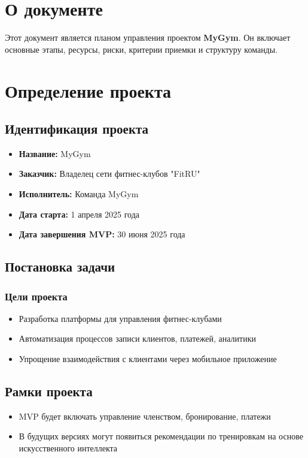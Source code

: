 \documentclass[14pt, russian]{matmex-diploma-custom}
\begin{document}

\maketitle
\section{О документе}
Этот документ является планом управления проектом \textbf{MyGym}. Он включает основные этапы, ресурсы, риски, критерии приемки и структуру команды.

\section{Определение проекта}
\subsection{Идентификация проекта}
\begin{itemize}
\item \textbf{Название:} MyGym
\item \textbf{Заказчик:} Владелец сети фитнес-клубов "FitRU"
\item \textbf{Исполнитель:} Команда MyGym
\item \textbf{Дата старта:} 1 апреля 2025 года
\item \textbf{Дата завершения MVP:} 30 июня 2025 года
\end{itemize}

\subsection{Постановка задачи}
\subsubsection{Цели проекта}
\begin{itemize}
\item Разработка платформы для управления фитнес-клубами
\item Автоматизация процессов записи клиентов, платежей, аналитики
\item Упрощение взаимодействия с клиентами через мобильное приложение
\end{itemize}

\subsection{Рамки проекта}
\begin{itemize}
\item MVP будет включать управление членством, бронирование, платежи
\item В будущих версиях могут появиться рекомендации по тренировкам на основе искусственного интеллекта
\end{itemize}
\end{document}
